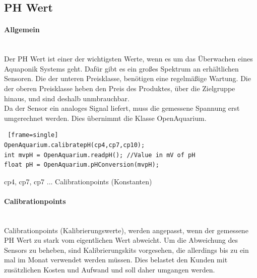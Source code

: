 \documentclass[11pt]{article}
\begin{document}
\subsection{PH Wert}
\paragraph{Allgemein} \mbox{} \\
Der PH Wert ist einer der wichtigsten Werte, wenn es um das \"Uberwachen eines Aquaponik Systems geht. Daf\"ur gibt es ein gro{\ss}es Spektrum an erh\"altlichen Sensoren. Die der unteren Preisklasse, ben\"otigen eine regelm\"a{\ss}ige Wartung. Die der oberen Preisklasse heben den Preis des Produktes, \"uber die Zielgruppe hinaus, und sind deshalb unmbrauchbar. \\
Da der Sensor ein analoges Signal liefert, muss die gemessene Spannung erst umgerechnet werden. Dies \"ubernimmt die Klasse OpenAquarium.

\begin{lstlisting} [frame=single]
OpenAquarium.calibratepH(cp4,cp7,cp10);
int mvpH = OpenAquarium.readpH(); //Value in mV of pH
float pH = OpenAquarium.pHConversion(mvpH);
\end{lstlisting}
cp4, cp7, cp7 ... Calibrationpoints (Konstanten)

\paragraph{Calibrationpoints} \mbox{} \\
Calibrationpoints (Kalibrierungswerte), werden angepasst, wenn der gemessene PH Wert zu stark vom eigentlichen Wert abweicht. Um die Abweichung des Sensors zu beheben, sind Kalibrierungskits vorgesehen, die allerdings bis zu ein mal im Monat verwendet werden m\"ussen. Dies belastet den Kunden mit zus\"atzlichen Kosten und Aufwand und soll daher umgangen werden.
\end{document}
